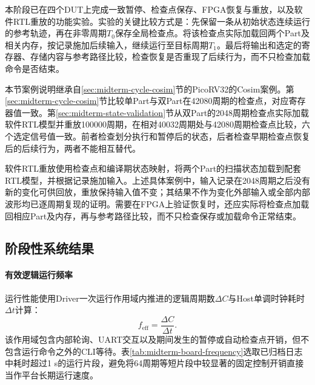 本阶段已在四个DUT上完成一致暂停、检查点保存、FPGA恢复与重放，以及软件RTL重放的功能实验。实验的关键比较方式是：先保留一条从初始状态连续运行的参考轨迹，再在非零周期$T_0$保存全局检查点。将该检查点实际加载回两个Part及相关内存，按记录施加后续输入，继续运行至目标周期$T_1$。最后将输出和选定的寄存器、存储内容与参考路径比较，检查恢复是否重现了后续行为，而不只检查加载命令是否结束。

本节案例说明继承自\ref{sec:midterm-cycle-cosim}节的PicoRV32的Cosim案例。第\ref{sec:midterm-cycle-cosim}节比较单Part与双Part在42080周期的检查点，对应寄存器值一致。第\ref{sec:midterm-state-validation}节从双Part的2048周期检查点实际加载软件RTL模型并重放100000周期，在相对40032周期处与42080周期检查点比较，六个选定信号值一致。前者检查划分执行和暂停后的状态，后者检查早期检查点恢复后的后续行为，两者不能相互替代。

软件RTL重放使用检查点和编译期状态映射，将两个Part的扫描状态加载到配套RTL模型，并根据记录施加输入。上述具体案例中，输入记录在2048周期之后没有新的变化可供回放，重放保持输入值不变；其结果不作为变化外部输入或全部内部波形均已逐周期复现的证明。需要在FPGA上验证恢复时，还应实际将检查点加载回相应Part及内存，再与参考路径比较，而不只检查保存或加载命令正常结束。



\subsection{阶段性系统结果}
\label{sec:midterm-prototype-results}

\paragraph{有效逻辑运行频率}

运行性能使用Driver一次运行作用域内推进的逻辑周期数$\Delta C$与Host单调时钟耗时$\Delta t$计算：
\begin{equation}
    f_{\mathrm{eff}}=\frac{\Delta C}{\Delta t}.
    \label{eq:midterm-effective-frequency}
\end{equation}
该作用域包含内部轮询、UART交互以及期间发生的暂停或自动检查点开销，但不包含运行命令之外的CLI等待。表\ref{tab:midterm-board-frequency}选取已归档日志中耗时超过1 s的运行片段，避免将64周期等短片段中较显著的固定控制开销直接当作平台长期运行速度。

